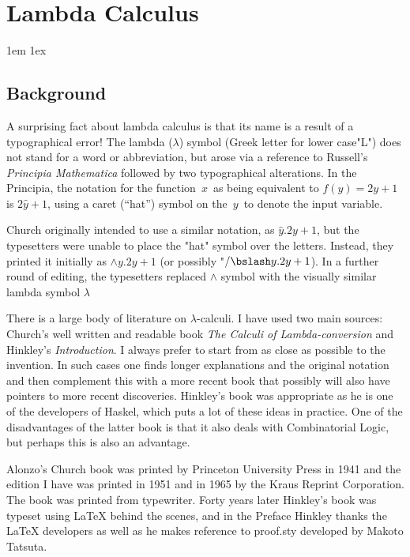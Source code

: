 \chapter{Lambda Calculus}
\parindent1em
\parskip1ex

\section{Background}

A surprising fact about lambda calculus is that its name is a result of a typographical error! 
The lambda ($\lambda$) symbol (Greek letter for lower case"L") does not stand for a word or abbreviation, but arose via a reference to Russell's \textit{Principia Mathematica} followed by  two typographical alterations. In the Principia, the notation for the function~$x$~as being equivalent to $f(y)=2y+1$ is $2\hat{y}+1$, using a caret (``hat'') symbol on the~$y$~to denote the input variable. 

Church originally intended to use a similar notation, as $\hat{y}.2y+1$, but the typesetters were unable to place the "hat" symbol over the letters.  Instead, they printed it initially as $\land y.2y+1$ (or possibly "$/\bslash y.2y+1$). In a further round of editing, the typesetters replaced $\land$ symbol with the visually similar lambda symbol $\lambda$

There is a large body of literature on $\lambda$-calculi. I have used two main sources: Church's well written and readable book \textit{The Calculi of Lambda-conversion} and Hinkley's \textit{Introduction}. I always prefer to start from as close as possible to the invention. In such cases one finds longer explanations and the original notation and then complement this with a more recent book that possibly will also have pointers to more recent discoveries. Hinkley's book was appropriate as he is one of the developers of Haskel, which puts a lot of these ideas in practice. One of the disadvantages of the latter book is that it also deals with Combinatorial Logic, but perhaps this is also an advantage.

Alonzo's Church book was printed by Princeton University Press in 1941 and the edition I have was printed in 1951 and in 1965 by the Kraus Reprint Corporation. The book was printed from typewriter. Forty years later Hinkley's book was typeset using LaTeX behind the scenes, and in the Preface Hinkley thanks the LaTeX developers as well as he makes reference to proof.sty developed by Makoto Tatsuta.


